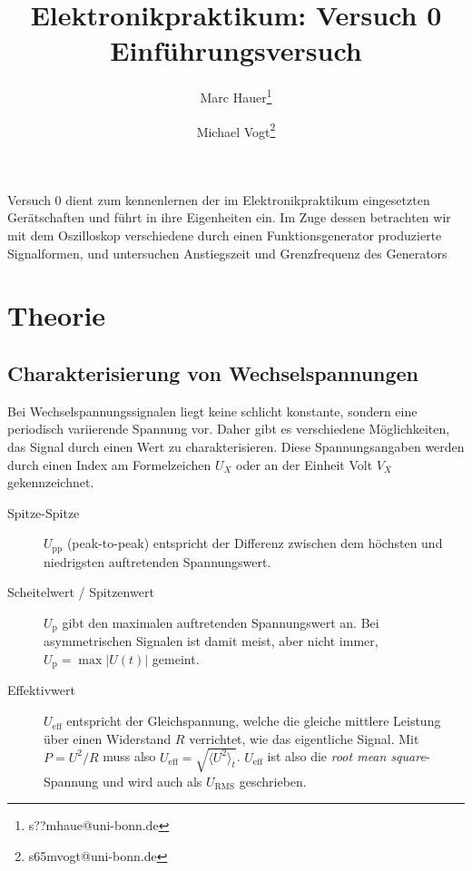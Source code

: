 \documentclass{article}
\title{Elektronikpraktikum: Versuch 0 \\ Einführungsversuch}
\author[1]{Marc Hauer\thanks{s??mhaue@uni-bonn.de}}
\author[1]{Michael Vogt\thanks{s65mvogt@uni-bonn.de}}
\affil[1]{Uni Bonn}
\begin{document}
\maketitle
\tableofcontents
\newpage
{}

\pagestyle{fancy}
\fancyhead[R]{\thepage}
\fancyhead[L]{\leftmark}


Versuch 0 dient zum kennenlernen der im Elektronikpraktikum eingesetzten Gerätschaften und führt in ihre Eigenheiten ein.
Im Zuge dessen betrachten wir mit dem Oszilloskop verschiedene durch einen Funktionsgenerator produzierte Signalformen,
und untersuchen Anstiegszeit und Grenzfrequenz des Generators

\section{Theorie}
\subsection{Charakterisierung von Wechselspannungen}
Bei Wechselspannungssignalen liegt keine schlicht konstante, sondern eine periodisch variierende Spannung vor.
Daher gibt es verschiedene Möglichkeiten, das Signal durch einen Wert zu charakterisieren.
Diese Spannungsangaben werden durch einen Index am Formelzeichen $U_X$ oder an der Einheit Volt $V_X$ gekennzeichnet.
\begin{description} 
  \item[Spitze-Spitze] $U_\mathrm{pp}$ (peak-to-peak) entspricht der Differenz zwischen
  dem höchsten und niedrigsten auftretenden Spannungswert.
  \item[Scheitelwert / Spitzenwert] $U_\mathrm{p}$ gibt den maximalen auftretenden Spannungswert an. Bei asymmetrischen Signalen
  ist damit meist, aber nicht immer, $U_\mathrm{p} = \max{\lvert U(t) \rvert}$ gemeint.
  \item[Effektivwert] $U_\mathrm{eff}$ entspricht der Gleichspannung, welche die gleiche mittlere Leistung über einen Widerstand
  $R$ verrichtet, wie das eigentliche Signal. Mit $P=U^2/R$ muss also $U_\mathrm{eff} = \sqrt{\langle U^2 \rangle_t}$.
  $U_\mathrm{eff}$ ist also die \textit{root mean square}-Spannung und wird auch als $U_\mathrm{RMS}$ geschrieben.
\end{description} 
\end{document}
